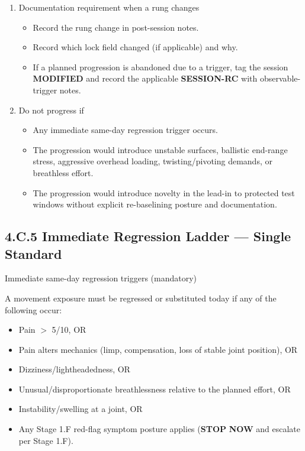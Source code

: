 \documentclass[10pt]{article}
\begin{document}
\begin{enumerate}
\item Documentation requirement when a rung changes

\begin{itemize}
\item Record the rung change in post-session notes.
\item Record which lock field changed (if applicable) and why.
\item If a planned progression is abandoned due to a trigger, tag the session \textbf{MODIFIED} and record the applicable \textbf{SESSION-RC} with observable-trigger notes.
\end{itemize}

\item Do not progress if

\begin{itemize}
\item Any immediate same-day regression trigger occurs.
\item The progression would introduce unstable surfaces, ballistic end-range stress, aggressive overhead loading, twisting/pivoting demands, or breathless effort.
\item The progression would introduce novelty in the lead-in to protected test windows without explicit re-baselining posture and documentation.
\end{itemize}
\end{enumerate}

\subsection*{4.C.5 Immediate Regression Ladder — Single Standard}
{}

Immediate same-day regression triggers (mandatory)

A movement exposure must be regressed or substituted today if any of the following occur:

\begin{itemize}
\item Pain $>$ 5/10, OR
\item Pain alters mechanics (limp, compensation, loss of stable joint position), OR
\item Dizziness/lightheadedness, OR
\item Unusual/disproportionate breathlessness relative to the planned effort, OR
\item Instability/swelling at a joint, OR
\item Any Stage 1.F red-flag symptom posture applies (\textbf{STOP} \textbf{NOW} and escalate per Stage 1.F).
\end{itemize}
\end{document}
